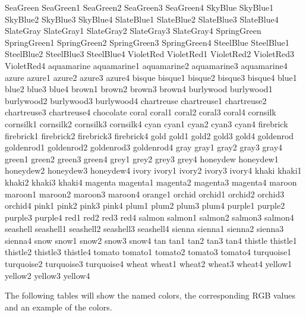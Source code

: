 SeaGreen
SeaGreen1
SeaGreen2
SeaGreen3
SeaGreen4
SkyBlue
SkyBlue1
SkyBlue2
SkyBlue3
SkyBlue4
SlateBlue1
SlateBlue2
SlateBlue3
SlateBlue4
SlateGray
SlateGray1
SlateGray2
SlateGray3
SlateGray4
SpringGreen
SpringGreen1
SpringGreen2
SpringGreen3
SpringGreen4
SteelBlue
SteelBlue1
SteelBlue2
SteelBlue3
SteelBlue4
VioletRed
VioletRed1
VioletRed2
VioletRed3
VioletRed4
aquamarine
aquamarine1
aquamarine2
aquamarine3
aquamarine4
azure
azure1
azure2
azure3
azure4
bisque
bisque1
bisque2
bisque3
bisque4
blue1
blue2
blue3
blue4
brown1
brown2
brown3
brown4
burlywood
burlywood1
burlywood2
burlywood3
burlywood4
chartreuse
chartreuse1
chartreuse2
chartreuse3
chartreuse4
chocolate
coral
coral1
coral2
coral3
coral4
cornsilk
cornsilk1
cornsilk2
cornsilk3
cornsilk4
cyan
cyan1
cyan2
cyan3
cyan4
firebrick
firebrick1
firebrick2
firebrick3
firebrick4
gold
gold1
gold2
gold3
gold4
goldenrod
goldenrod1
goldenrod2
goldenrod3
goldenrod4
gray
gray1
gray2
gray3
gray4
green1
green2
green3
green4
grey1
grey2
grey3
grey4
honeydew
honeydew1
honeydew2
honeydew3
honeydew4
ivory
ivory1
ivory2
ivory3
ivory4
khaki
khaki1
khaki2
khaki3
khaki4
magenta
magenta1
magenta2
magenta3
magenta4
maroon
maroon1
maroon2
maroon3
maroon4
orange1
orchid
orchid1
orchid2
orchid3
orchid4
pink1
pink2
pink3
pink4
plum1
plum2
plum3
plum4
purple1
purple2
purple3
purple4
red1
red2
red3
red4
salmon
salmon1
salmon2
salmon3
salmon4
seashell
seashell1
seashell2
seashell3
seashell4
sienna
sienna1
sienna2
sienna3
sienna4
snow
snow1
snow2
snow3
snow4
tan
tan1
tan2
tan3
tan4
thistle
thistle1
thistle2
thistle3
thistle4
tomato
tomato1
tomato2
tomato3
tomato4
turquoise1
turquoise2
turquoise3
turquoise4
wheat
wheat1
wheat2
wheat3
wheat4
yellow1
yellow2
yellow3
yellow4


\vspace{2ex}
The following tables will show the named colors, the corresponding RGB values and an example of the colors.


